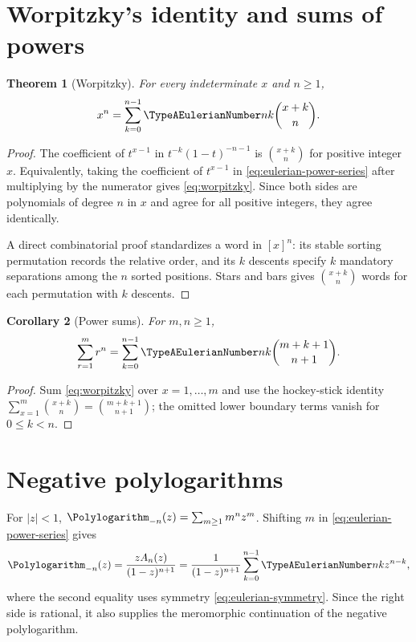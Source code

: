 \documentclass[11pt,a4paper,oneside,openany]{book}
\newtheorem{theorem}{Theorem}[chapter]
\newtheorem{corollary}[theorem]{Corollary}
\theoremstyle{definition}
\theoremstyle{remark}
\begin{document}
\section{Worpitzky's identity and sums of powers}
\begin{theorem}[Worpitzky]\label{thm:worpitzky}
For every indeterminate $x$ and $n\ge1$,
\begin{equation}\label{eq:worpitzky}
 x^n=\sum_{k=0}^{n-1}\TypeAEulerianNumber nk\binom{x+k}{n}.
\end{equation}
\end{theorem}
\begin{proof}
The coefficient of $t^{x-1}$ in
$t^{-k}(1-t)^{-n-1}$ is $\binom{x+k}{n}$ for positive integer $x$.
Equivalently, taking the coefficient of $t^{x-1}$ in
\eqref{eq:eulerian-power-series} after multiplying by the numerator gives
\eqref{eq:worpitzky}.  Since both sides are polynomials of degree $n$ in $x$ and
agree for all positive integers, they agree identically.

A direct combinatorial proof standardizes a word in $[x]^n$: its stable sorting
permutation records the relative order, and its $k$ descents specify $k$ mandatory
separations among the $n$ sorted positions.  Stars and bars gives
$\binom{x+k}{n}$ words for each permutation with $k$ descents.
\end{proof}

\begin{corollary}[Power sums]\label{cor:eulerian-power-sum}
For $m,n\ge1$,
\begin{equation}\label{eq:eulerian-power-sum}
 \sum_{r=1}^{m}r^n
 =\sum_{k=0}^{n-1}\TypeAEulerianNumber nk\binom{m+k+1}{n+1}.
\end{equation}
\end{corollary}
\begin{proof}
Sum \eqref{eq:worpitzky} over $x=1,\ldots,m$ and use the hockey-stick identity
$\sum_{x=1}^{m}\binom{x+k}{n}=\binom{m+k+1}{n+1}$; the omitted lower boundary
terms vanish for $0\le k<n$.
\end{proof}

\section{Negative polylogarithms}
For $|z|<1$, $\Polylogarithm_{-n}(z)=\sum_{m\ge1}m^nz^m$.  Shifting $m$ in
\eqref{eq:eulerian-power-series} gives
\begin{equation}\label{eq:negative-polylog-eulerian}
 \Polylogarithm_{-n}(z)=\frac{zA_n(z)}{(1-z)^{n+1}}
 =\frac{1}{(1-z)^{n+1}}
   \sum_{k=0}^{n-1}\TypeAEulerianNumber nk z^{n-k},
\end{equation}
where the second equality uses symmetry \eqref{eq:eulerian-symmetry}.  Since the
right side is rational, it also supplies the meromorphic continuation of the
negative polylogarithm.
\end{document}
